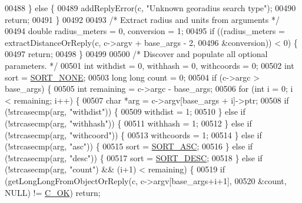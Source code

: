 \begin{DoxyCode}
{{{{{{{{{00488     \} \textcolor{keywordflow}{else} \{
00489         addReplyError(c, \textcolor{stringliteral}{"Unknown georadius search type"});
00490         \textcolor{keywordflow}{return};
00491     \}
00492 
00493     \textcolor{comment}{/* Extract radius and units from arguments */}
00494     \textcolor{keywordtype}{double} radius\_meters = 0, conversion = 1;
00495     \textcolor{keywordflow}{if} ((radius\_meters = extractDistanceOrReply(c, c->argv + base\_args - 2,
00496                                                 &conversion)) < 0) \{
00497         \textcolor{keywordflow}{return};
00498     \}
00499 
00500     \textcolor{comment}{/* Discover and populate all optional parameters. */}
00501     \textcolor{keywordtype}{int} withdist = 0, withhash = 0, withcoords = 0;
00502     \textcolor{keywordtype}{int} sort = \hyperlink{geo_8c_ac14be771411e01611e9e539c87567be4}{SORT\_NONE};
00503     \textcolor{keywordtype}{long} \textcolor{keywordtype}{long} count = 0;
00504     \textcolor{keywordflow}{if} (c->argc > base\_args) \{
00505         \textcolor{keywordtype}{int} remaining = c->argc - base\_args;
00506         \textcolor{keywordflow}{for} (\textcolor{keywordtype}{int} i = 0; i < remaining; i++) \{
00507             \textcolor{keywordtype}{char} *arg = c->argv[base\_args + i]->ptr;
00508             \textcolor{keywordflow}{if} (!strcasecmp(arg, \textcolor{stringliteral}{"withdist"})) \{
00509                 withdist = 1;
00510             \} \textcolor{keywordflow}{else} \textcolor{keywordflow}{if} (!strcasecmp(arg, \textcolor{stringliteral}{"withhash"})) \{
00511                 withhash = 1;
00512             \} \textcolor{keywordflow}{else} \textcolor{keywordflow}{if} (!strcasecmp(arg, \textcolor{stringliteral}{"withcoord"})) \{
00513                 withcoords = 1;
00514             \} \textcolor{keywordflow}{else} \textcolor{keywordflow}{if} (!strcasecmp(arg, \textcolor{stringliteral}{"asc"})) \{
00515                 sort = \hyperlink{geo_8c_a4cc2ef7982bc374e2ba1832ace8338b7}{SORT\_ASC};
00516             \} \textcolor{keywordflow}{else} \textcolor{keywordflow}{if} (!strcasecmp(arg, \textcolor{stringliteral}{"desc"})) \{
00517                 sort = \hyperlink{geo_8c_ad337a9ccff0b910f5a05d97cb5f3231e}{SORT\_DESC};
00518             \} \textcolor{keywordflow}{else} \textcolor{keywordflow}{if} (!strcasecmp(arg, \textcolor{stringliteral}{"count"}) && (i+1) < remaining) \{
00519                 \textcolor{keywordflow}{if} (getLongLongFromObjectOrReply(c, c->argv[base\_args+i+1],
00520                     &count, NULL) != \hyperlink{server_8h_a303769ef1065076e68731584e758d3e1}{C\_OK}) \textcolor{keywordflow}{return};
}}}}}}}}}
\end{DoxyCode}
